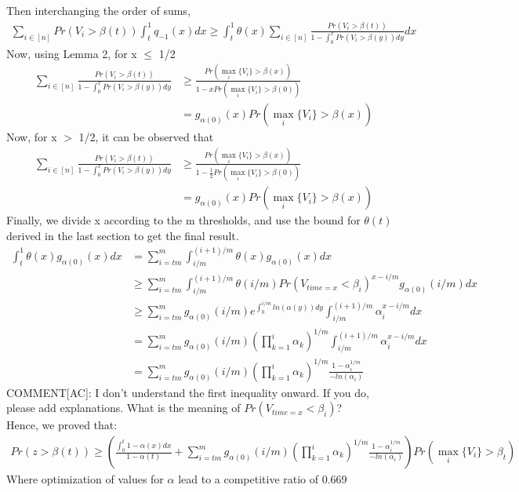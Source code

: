 \documentclass[12pt, letterpaper, twoside]{article}
\begin{document}
Then interchanging the order of sums,
\begin{align*}
\sum_{i \in [n]} Pr(V_{i} > \beta(t)) \int_{t}^{1} q_{-1}(x) dx \geq \int_{t}^{1} \theta(x) \sum_{i \in [n]} \frac{Pr(V_{i} > \beta(t))}{1 - \int_{0}^{x} Pr(V_{i} > \beta(y)) dy} dx
\end{align*}
Now, using Lemma 2, for x $\leq$ 1/2
\begin{align*}
\sum_{i \in [n]} \frac{Pr(V_{i} > \beta(t))}{1 - \int_{0}^{x} Pr(V_{i} > \beta(y)) dy} &\geq \frac{Pr(\max_{i} \{V_{i}\} > \beta(x))}{1-xPr(\max_{i} \{V_{i}\} > \beta(0))}\\
&= g_{\alpha(0)} (x) Pr(\max_{i} \{V_{i}\} > \beta(x))
\end{align*}
Now, for x $>$ 1/2, it can be observed that \\
\begin{align*}
\sum_{i \in [n]} \frac{Pr(V_{i} > \beta(t))}{1 - \int_{0}^{x} Pr(V_{i} > \beta(y)) dy} &\geq \frac{Pr(\max_{i} \{V_{i}\} > \beta(x))}{1-\frac{1}{2}Pr(\max_{i} \{V_{i}\} > \beta(0))} \\
&= g_{\alpha(0)} (x) Pr(\max_{i} \{V_{i}\} > \beta(x))
\end{align*}
Finally, we divide x according to the m thresholds, and use the bound for $\theta(t)$ derived in the last section to get the final result.
\begin{align*}
\int_{t}^{1} \theta(x) g_{\alpha(0)} (x) dx &= \sum_{i = tm}^{m} \int_{i/m}^{(i+1)/m} \theta(x) g_{\alpha(0)} (x) dx\\
&\geq \sum_{i = tm}^{m} \int_{i/m}^{(i+1)/m} \theta(i/m) Pr(V_{time=x} < \beta_{i})^{x - i/m} g_{\alpha(0)} (i/m) dx\\
&\geq \sum_{i = tm}^{m} g_{\alpha(0)}(i/m) e^{\int_{0}^{i/m} ln(\alpha(y)) dy} \int_{i/m}^{(i+1)/m} \alpha_{i}^{x - i/m}  dx\\
&= \sum_{i = tm}^{m} g_{\alpha(0)}(i/m) (\prod_{k=1}^{i} \alpha_{k})^{1/m} \int_{i/m}^{(i+1)/m} \alpha_{i}^{x - i/m}  dx\\
&= \sum_{i = tm}^{m} g_{\alpha(0)}(i/m) (\prod_{k=1}^{i} \alpha_{k})^{1/m} \frac{1 - \alpha_{i} ^ {1/m}}{-ln(\alpha_{i})}
\end{align*}
COMMENT[AC]: I don't understand the first inequality onward. If you do, please add explanations. What is the meaning of $Pr(V_{time=x} < \beta_{i})$?\\
Hence, we proved that:
\begin{align*}
Pr(z > \beta(t)) \geq (\frac{\int_{0}^{t} 1 - \alpha(x) dx}{1-\alpha(t)} + \sum_{i = tm}^{m} g_{\alpha(0)}(i/m) (\prod_{k=1}^{i} \alpha_{k})^{1/m} \frac{1 - \alpha_{i} ^ {1/m}}{-ln(\alpha_{i})}) Pr(\max_{i} \{V_{i}\} > \beta_{t})
\end{align*}
Where optimization of values for $\alpha$ lead to a competitive ratio of 0.669
\end{document}

